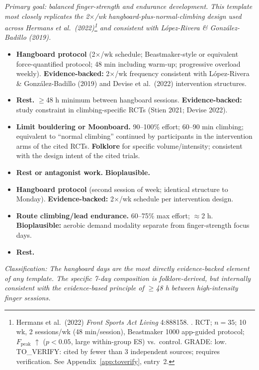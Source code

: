 \noindent\textit{Primary goal: balanced finger-strength and endurance development. This template most closely replicates the 2$\times$/wk hangboard-plus-normal-climbing design used across Hermans et al.\ (2022)\footnote{Hermans et al.\ (2022) \textit{Front Sports Act Living} 4:888158. \cite{HO22}. RCT; $n = 35$; 10 wk, 2 sessions/wk (48 min/session), Beastmaker 1000 app-guided protocol; $F_\mathrm{peak}$ $\uparrow$ ($p < 0.05$, large within-group ES) vs.\ control. GRADE: low. TO\_VERIFY: cited by fewer than 3 independent sources; requires verification. See Appendix~\ref{app:toverify}, entry~2.} and consistent with López-Rivera \& González-Badillo (2019).}

\begin{itemize}[leftmargin=1.6cm,labelwidth=1.2cm,align=left]
  \item[\textbf{Mon:}] \textbf{Hangboard protocol} (2$\times$/wk schedule; Beastmaker-style or equivalent force-quantified protocol; 48 min including warm-up; progressive overload weekly). \textbf{Evidence-backed:} 2$\times$/wk frequency consistent with López-Rivera \& González-Badillo (2019) and Devise et al.\ (2022) intervention structures.
  \item[\textbf{Tue:}] \textbf{Rest.} $\geq$48 h minimum between hangboard sessions. \textbf{Evidence-backed:} study constraint in climbing-specific RCTs (Stien 2021; Devise 2022).
  \item[\textbf{Wed:}] \textbf{Limit bouldering or Moonboard.} 90–100\% effort; 60–90 min climbing; equivalent to ``normal climbing'' continued by participants in the intervention arms of the cited RCTs. \textbf{Folklore} for specific volume/intensity; consistent with the design intent of the cited trials.
  \item[\textbf{Thu:}] \textbf{Rest or antagonist work.} \textbf{Bioplausible.}
  \item[\textbf{Fri:}] \textbf{Hangboard protocol} (second session of week; identical structure to Monday). \textbf{Evidence-backed:} 2$\times$/wk schedule per intervention design.
  \item[\textbf{Sat:}] \textbf{Route climbing/lead endurance.} 60–75\% max effort; $\approx$2 h. \textbf{Bioplausible:} aerobic demand modality separate from finger-strength focus days.
  \item[\textbf{Sun:}] \textbf{Rest.}
\end{itemize}

\noindent\textit{Classification: The hangboard days are the most directly evidence-backed element of any template. The specific 7-day composition is folklore-derived, but internally consistent with the evidence-based principle of $\geq$48 h between high-intensity finger sessions.}

